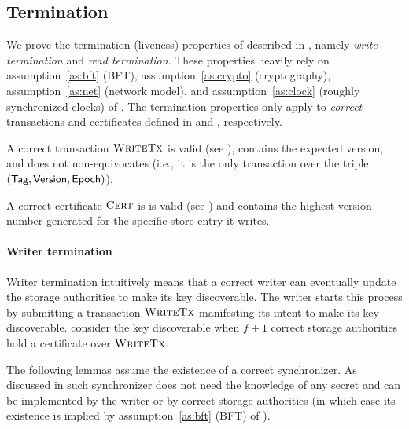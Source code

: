 \subsection{Termination} \label{sec:termination}
We prove the termination (liveness) properties of \sysname described in , namely \emph{write termination} and \emph{read termination}. These properties heavily rely on assumption~\ref{as:bft} (BFT), assumption~\ref{as:crypto} (cryptography), assumption~\ref{as:net} (network model), and assumption~\ref{as:clock} (roughly synchronized clocks) of .
%
The termination properties only apply to \emph{correct} transactions and certificates defined in  and , respectively.

\begin{definition} \label{def:correct-tx}
    A correct transaction $\textsc{WriteTx}$ is valid (see ), contains the expected version, and does not non-equivocates (i.e., it is the only transaction over the triple $(\textsf{Tag}, \textsf{Version}, \textsf{Epoch})$).
\end{definition}

\begin{definition} \label{def:correct-cert}
    A correct certificate $\textsc{Cert}$ is is valid (see ) and contains the highest version number generated for the specific store entry it writes.
\end{definition}

\paragraph{Writer termination}
Writer termination intuitively means that a correct writer can eventually update the storage authorities to make its key discoverable. The writer starts this process by submitting a transaction $\textsc{WriteTx}$ manifesting its intent to make its key discoverable. \sysname consider the key discoverable when $f+1$ correct storage authorities hold a certificate over $\textsc{WriteTx}$.

The following lemmas assume the existence of a correct synchronizer. As discussed in  such synchronizer does not need the knowledge of any secret and can be implemented by the writer or by correct storage authorities (in which case its existence is implied by assumption~\ref{as:bft} (BFT) of ).

